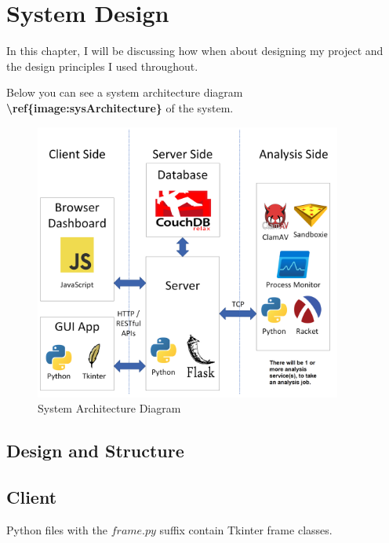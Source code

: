 \chapter{System Design}

In this chapter, I will be discussing how when about designing my project
and the design principles I used throughout.

Below you can see a system architecture diagram
\textbf{\textbackslash{}ref\{image:sysArchitecture\}} of the system.

\begin{figure}[h!]
    \includegraphics[width=0.9\textwidth]{images/architecture.png}
    \caption{System Architecture Diagram}
    \label{image:sysArchitecture}
\end{figure}

\section{Design and Structure}

\section{Client}
Python files with the $frame.py$ suffix contain Tkinter frame classes.

